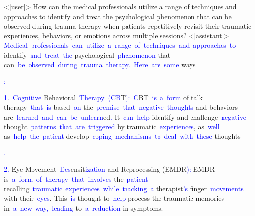 \documentclass{article}
\begin{document}
\begin{tcolorbox}[colframe=black,colback=white]
<|user|>
How can the medical professionals utilize a range of techniques and approaches to identify and treat the psychological phenomenon that can be observed during trauma therapy when patients repetitively revisit their traumatic experiences, behaviors, or emotions across multiple sessions?
<|assistant|>
\textcolor{blue}{Medical}\textcolor{blue}{~professionals}\textcolor{blue}{~can}\textcolor{blue}{~utilize}\textcolor{blue}{~a}\textcolor{blue}{~range}\textcolor{blue}{~of}\textcolor{blue}{~techniques}\textcolor{blue}{~and}\textcolor{blue}{~approaches}\textcolor{blue}{~to} identify\textcolor{blue}{~and}\textcolor{blue}{~treat}\textcolor{blue}{~the} psychological\textcolor{blue}{~phenomenon} that can\textcolor{blue}{~be}\textcolor{blue}{~observed}\textcolor{blue}{~during}\textcolor{blue}{~trauma}\textcolor{blue}{~therapy}\textcolor{blue}{.}\textcolor{blue}{~Here}\textcolor{blue}{~are}\textcolor{blue}{~some} ways\textcolor{blue}{:

}\textcolor{blue}{1}\textcolor{blue}{.}\textcolor{blue}{~Cognitive} Behavioral\textcolor{blue}{~Therapy}\textcolor{blue}{~(}\textcolor{blue}{CB}T\textcolor{blue}{):}\textcolor{blue}{~C}BT\textcolor{blue}{~is}\textcolor{blue}{~a}\textcolor{blue}{~form} of talk therapy\textcolor{blue}{~that}\textcolor{blue}{~is} based\textcolor{blue}{~on} the\textcolor{blue}{~premise}\textcolor{blue}{~that}\textcolor{blue}{~negative}\textcolor{blue}{~thoughts} and behaviors are\textcolor{blue}{~learned}\textcolor{blue}{~and}\textcolor{blue}{~can}\textcolor{blue}{~be}\textcolor{blue}{~un}\textcolor{blue}{learn}ed\textcolor{blue}{.} It\textcolor{blue}{~can}\textcolor{blue}{~help} identify and challenge\textcolor{blue}{~negative} thought\textcolor{blue}{~patterns}\textcolor{blue}{~that}\textcolor{blue}{~are}\textcolor{blue}{~triggered} by traumatic\textcolor{blue}{~experiences}, as\textcolor{blue}{~well} as\textcolor{blue}{~help}\textcolor{blue}{~the}\textcolor{blue}{~patient} develop\textcolor{blue}{~coping}\textcolor{blue}{~mechanisms}\textcolor{blue}{~to}\textcolor{blue}{~deal}\textcolor{blue}{~with}\textcolor{blue}{~these} thoughts\textcolor{blue}{.

}\textcolor{blue}{2}\textcolor{blue}{.} Eye Movement\textcolor{blue}{~Des}ensit\textcolor{blue}{ization} and Reprocessing (EMDR\textcolor{blue}{):} EMDR is\textcolor{blue}{~a}\textcolor{blue}{~form}\textcolor{blue}{~of}\textcolor{blue}{~therapy}\textcolor{blue}{~that}\textcolor{blue}{~involves} the\textcolor{blue}{~patient} recalling\textcolor{blue}{~traumatic}\textcolor{blue}{~experiences}\textcolor{blue}{~while}\textcolor{blue}{~tracking}\textcolor{blue}{~a} therapist\textcolor{blue}{'s} finger\textcolor{blue}{~movements} with their\textcolor{blue}{~eyes}. This\textcolor{blue}{~is} thought to\textcolor{blue}{~help} process the traumatic memories in\textcolor{blue}{~a}\textcolor{blue}{~new}\textcolor{blue}{~way}\textcolor{blue}{,}\textcolor{blue}{~leading} to\textcolor{blue}{~a}\textcolor{blue}{~reduction} in symptoms.


\end{tcolorbox}
\end{document}
